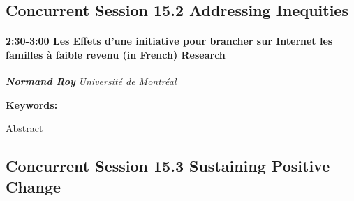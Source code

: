 \documentclass[
]{book}
\begin{document}
\hypertarget{concurrent-session-15.2-addressing-inequities}{%
\subsection*{Concurrent Session 15.2 \textbar{} Addressing Inequities}\label{concurrent-session-15.2-addressing-inequities}}

\begin{session}
\hypertarget{les-effets-dune-initiative-pour-brancher-sur-internet-les-familles-uxe0-faible-revenu-in-french-research}{%
\paragraph*{\texorpdfstring{2:30-3:00 \textbar{} \textbf{Les Effets
d'une initiative pour brancher sur Internet les familles à faible revenu
(in French)} \textbar{}
Research}{2:30-3:00 \textbar{} Les Effets d'une initiative pour brancher sur Internet les familles à faible revenu (in French) \textbar{} Research}}\label{les-effets-dune-initiative-pour-brancher-sur-internet-les-familles-uxe0-faible-revenu-in-french-research}}

\textbf{\emph{Normand Roy}} \textbar{} \emph{Université de Montréal}

\textbf{Keywords:}

Abstract
\end{session}

\hypertarget{concurrent-session-15.3-sustaining-positive-change}{%
\subsection*{Concurrent Session 15.3 \textbar{} Sustaining Positive Change}\label{concurrent-session-15.3-sustaining-positive-change}}
\end{document}
